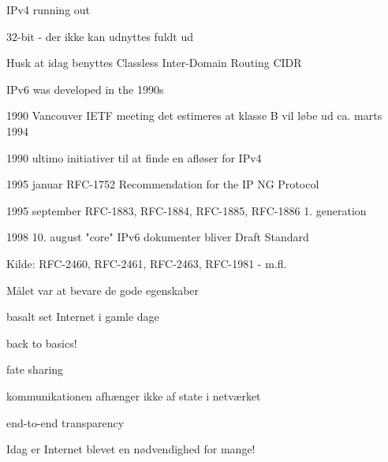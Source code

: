 \documentclass[Screen16to9,17pt]{foils}
\begin{document}


\begin{list1}
\item IPv4 running out
\item 32-bit - der ikke kan udnyttes fuldt ud
\item Husk at idag benyttes Classless Inter-Domain Routing CIDR\\
\item IPv6 was developed in the 1990s
\end{list1}


\begin{list2}
\item 1990 Vancouver IETF meeting
det estimeres at klasse B vil løbe ud ca. marts 1994

\item 1990 ultimo
initiativer til at finde en afløser for IPv4

\item 1995 januar
RFC-1752 Recommendation for the IP NG Protocol

\item 1995 september
RFC-1883, RFC-1884, RFC-1885, RFC-1886 1. generation

\item 1998 10. august
"core" IPv6 dokumenter bliver Draft Standard
\item
Kilde: RFC-2460, RFC-2461, RFC-2463, RFC-1981 - m.fl.
\end{list2}


\begin{list1}
\item Målet var at bevare de gode egenskaber
\begin{list2}
\item basalt set Internet i gamle dage
\item back to basics!
\item fate sharing
\item kommunikationen afhænger ikke af state i netværket
\item end-to-end transparency
\end{list2}
\item Idag er Internet blevet en nødvendighed for mange!
\end{list1}
\end{document}
